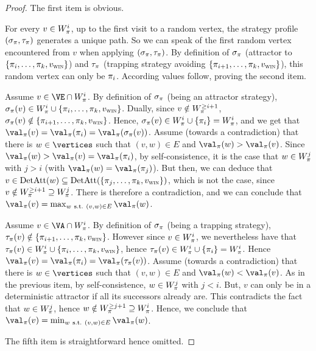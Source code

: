 \begin{proof}


The first item is obvious.

For every $v \in W_\pi^i$, up to the first visit to a random
vertex, the strategy profile $(\sigma_\pi,\tau_\pi)$ generates a
unique path. So we can speak of the first random vertex encountered
from $v$ when applying $(\sigma_\pi,\tau_\pi)$. By definition of
$\sigma_\pi$ (attractor to $\{\pi_i,\ldots,\pi_k,v_{\textsc{win}}\}$) and
$\tau_\pi$ (trapping strategy avoiding
$\{\pi_{i+1},\ldots,\pi_k,v_{\textsc{win}}\}$), this random vertex can only
be $\pi_i$. According values follow, proving the second item.

Assume $v \in \Evevertices \cap W_\perm^i$.  By definition of
$\sigma_\pi$ (being an attractor strategy), $\sigma_\pi(v) \in
W_\pi^i \cup \{\pi_i,\ldots,\pi_k,v_{\textsc{win}}\}$. Dually, since $v
\notin W_\pi^{\ge i+1}$, $\sigma_\pi(v) \notin
\{\pi_{i+1},\ldots,\pi_k,v_{\textsc{win}}\}$. Hence, $\sigma_\pi(v) \in
W_\pi^i \cup \{\pi_i\} = W_\pi^i$, and we get that
$\val_\perm(v) = \val_\perm(\perm_i) = \val_\perm(\sigma_\perm(v))$.
Assume (towards a contradiction) that there is $w \in \vertices$
such that $(v,w) \in E$ and $\val_\perm(w)>\val_\perm(v)$.  Since
$\val_\perm(w) > \val_\perm(v) = \val_\perm(\perm_i)$, by
self-consistence, it is the case that $w \in W_\pi^j$ with $j > i$
(with $\val_\perm(w) = \val_\perm(\perm_j)$). But then, we can
deduce that $v \in \textrm{DetAtt}(w) \subseteq
\textrm{DetAtt}(\{\pi_j,\ldots,\pi_k,v_{\textsc{win}}\})$, which is not the case,
since $v \notin W_\pi^{\ge i+1} \supseteq W_\pi^j$. There is
therefore a contradiction, and we can conclude that $\val_\perm(v) =
\max_{w\ \text{s.t.}\ (v,w) \in E} \val_\perm(w)$.


Assume $v \in \Adamvertices \cap W_\perm^i$. By definition of
$\sigma_\pi$ (being a trapping strategy), $\tau_\pi(v) \notin
\{\pi_{i+1},\ldots,\pi_k,v_{\textsc{win}}\}$. However since $v \in
W_\pi^i$, we nevertheless have that $\tau_\pi(v) \in W_\pi^i
\cup \{\pi_i,\ldots,\pi_k,v_{\textsc{win}}\}$, hence $\tau_\pi(v) \in
W_\pi^i \cup \{\pi_i\} = W_\pi^i$. Hence $\val_\perm(v) =
\val_\perm(\perm_i) = \val_\perm(\tau_\perm(v))$.  Assume (towards a
contradiction) that there is $w \in \vertices$ such that $(v,w) \in
E$ and $\val_\perm(w)<\val_\perm(v)$. As in the previous item, by
self-consistence, $w \in W_\pi^j$ with $j<i$. But, $v$ can only be
in a deterministic attractor if all its successors already are. This
contradicts the fact that $w \in W_\pi^j$, hence $w \notin
W_\pi^{\ge j+1} \supseteq W_\pi^i$. Hence, we conclude that
$\val_\perm(v) = \min_{w\ \text{s.t.}\ (v,w) \in E} \val_\perm(w)$.

The fifth item is straightforward hence omitted.
\end{proof}

